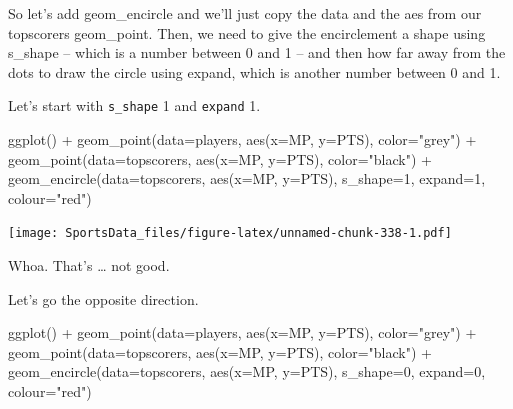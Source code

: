 \documentclass[
]{book}
\newenvironment{Shaded}{\begin{snugshade}}{\end{snugshade}}
\newcommand{\AttributeTok}[1]{\textcolor[rgb]{0.77,0.63,0.00}{#1}}
\newcommand{\DecValTok}[1]{\textcolor[rgb]{0.00,0.00,0.81}{#1}}
\newcommand{\FunctionTok}[1]{\textcolor[rgb]{0.00,0.00,0.00}{#1}}
\newcommand{\NormalTok}[1]{#1}
\newcommand{\SpecialCharTok}[1]{\textcolor[rgb]{0.00,0.00,0.00}{#1}}
\newcommand{\StringTok}[1]{\textcolor[rgb]{0.31,0.60,0.02}{#1}}
\begin{document}
So let's add geom\_encircle and we'll just copy the data and the aes from our topscorers geom\_point. Then, we need to give the encirclement a shape using s\_shape -- which is a number between 0 and 1 -- and then how far away from the dots to draw the circle using expand, which is another number between 0 and 1.

Let's start with \texttt{s\_shape} 1 and \texttt{expand} 1.

\begin{Shaded}
\begin{Highlighting}[]
\FunctionTok{ggplot}\NormalTok{() }\SpecialCharTok{+} 
  \FunctionTok{geom\_point}\NormalTok{(}\AttributeTok{data=}\NormalTok{players, }\FunctionTok{aes}\NormalTok{(}\AttributeTok{x=}\NormalTok{MP, }\AttributeTok{y=}\NormalTok{PTS), }\AttributeTok{color=}\StringTok{"grey"}\NormalTok{) }\SpecialCharTok{+} 
  \FunctionTok{geom\_point}\NormalTok{(}\AttributeTok{data=}\NormalTok{topscorers, }\FunctionTok{aes}\NormalTok{(}\AttributeTok{x=}\NormalTok{MP, }\AttributeTok{y=}\NormalTok{PTS), }\AttributeTok{color=}\StringTok{"black"}\NormalTok{) }\SpecialCharTok{+} 
  \FunctionTok{geom\_encircle}\NormalTok{(}\AttributeTok{data=}\NormalTok{topscorers, }\FunctionTok{aes}\NormalTok{(}\AttributeTok{x=}\NormalTok{MP, }\AttributeTok{y=}\NormalTok{PTS), }\AttributeTok{s\_shape=}\DecValTok{1}\NormalTok{, }\AttributeTok{expand=}\DecValTok{1}\NormalTok{, }\AttributeTok{colour=}\StringTok{"red"}\NormalTok{)}
\end{Highlighting}
\end{Shaded}

\texttt{[image: SportsData\_files/figure-latex/unnamed-chunk-338-1.pdf]}

Whoa. That's \ldots{} not good.

Let's go the opposite direction.

\begin{Shaded}
\begin{Highlighting}[]
\FunctionTok{ggplot}\NormalTok{() }\SpecialCharTok{+} 
  \FunctionTok{geom\_point}\NormalTok{(}\AttributeTok{data=}\NormalTok{players, }\FunctionTok{aes}\NormalTok{(}\AttributeTok{x=}\NormalTok{MP, }\AttributeTok{y=}\NormalTok{PTS), }\AttributeTok{color=}\StringTok{"grey"}\NormalTok{) }\SpecialCharTok{+} 
  \FunctionTok{geom\_point}\NormalTok{(}\AttributeTok{data=}\NormalTok{topscorers, }\FunctionTok{aes}\NormalTok{(}\AttributeTok{x=}\NormalTok{MP, }\AttributeTok{y=}\NormalTok{PTS), }\AttributeTok{color=}\StringTok{"black"}\NormalTok{) }\SpecialCharTok{+} 
  \FunctionTok{geom\_encircle}\NormalTok{(}\AttributeTok{data=}\NormalTok{topscorers, }\FunctionTok{aes}\NormalTok{(}\AttributeTok{x=}\NormalTok{MP, }\AttributeTok{y=}\NormalTok{PTS), }\AttributeTok{s\_shape=}\DecValTok{0}\NormalTok{, }\AttributeTok{expand=}\DecValTok{0}\NormalTok{, }\AttributeTok{colour=}\StringTok{"red"}\NormalTok{)}
\end{Highlighting}
\end{Shaded}
\end{document}
